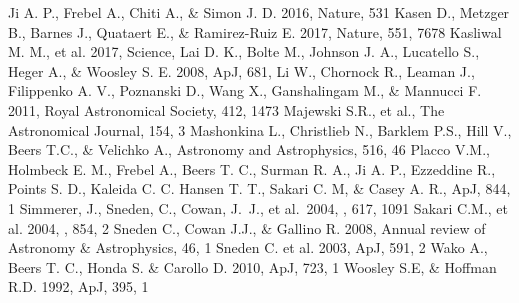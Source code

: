 \documentclass[a4paper,fleqn,usenatbib]{mnras}
\begin{document}
\begin{thebibliography}{99}
		Ji A. P., Frebel A., Chiti A., \& Simon J. D. 2016, Nature, 531
		Kasen D., Metzger B., Barnes J., Quataert E., \& Ramirez-Ruiz E. 2017, Nature, 551, 7678
		Kasliwal M. M., et al. 2017, Science,
		Lai D. K., Bolte M., Johnson J. A., Lucatello S., Heger A., \& Woosley S. E. 2008, ApJ, 681,
		Li W., Chornock R., Leaman J., Filippenko A. V., Poznanski D., Wang X., Ganshalingam M., \& Mannucci F. 2011, Royal Astronomical Society, 412, 1473
		Majewski S.R., et al., The Astronomical Journal, 154, 3
		Mashonkina L., Christlieb N., Barklem P.S., Hill V., Beers T.C., \& Velichko A., Astronomy and Astrophysics, 516, 46
		Placco V.M., Holmbeck E. M., Frebel A., Beers T. C., Surman R. A., Ji A. P., Ezzeddine R., Points S. D., Kaleida C. C. Hansen T. T., Sakari C. M, \& Casey A. R., ApJ, 844, 1
		 Simmerer, J., Sneden, C., Cowan, J.~J., et al.\ 2004, \apj, 617, 1091 
		 Sakari C.M., et al. 2004, \apj, 854, 2
		Sneden C., Cowan J.J., \& Gallino R. 2008, Annual review of Astronomy \& Astrophysics, 46, 1
		Sneden C. et al. 2003, ApJ, 591, 2
		Wako A., Beers T. C., Honda S. \& Carollo D. 2010, ApJ, 723, 1
		Woosley S.E, \& Hoffman R.D. 1992, ApJ, 395, 1
	\end{thebibliography}
	
\end{document}
